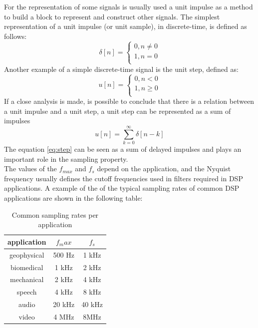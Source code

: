 For the representation of some signals is usually used a unit impulse as a method to build a block to represent and construct other signals. The simplest representation of a unit impulse (or unit sample), in discrete-time, is defined as follows:
\begin{equation}
    \delta[n] = \left\{ \begin{matrix} 
    0, n \ne 0\\
    1, n = 0\\
    \end{matrix}\right.
\end{equation}
Another example of a simple discrete-time signal is the unit step, defined as:
\begin{equation}
    u[n] = \left\{ \begin{matrix} 
    0, n < 0\\
    1, n \geq 0\\
    \end{matrix}\right.
\end{equation}
If a close analysis is made, is possible to conclude that there is a relation between a unit impulse and a unit step, a unit step can be represented as a sum of impulses
\begin{equation}\label{eq:step}
    u[n] = \sum_{k=0}^{\infty}\delta[n-k]
\end{equation}
The equation \ref{eq:step} can be seen as a sum of delayed impulses and plays an important role in the sampling property.\\
The values of the $f_{max}$ and $f_s$ depend on the application, and the Nyquist frequency usually defines the cutoff frequencies used in filters required in DSP applications. A example of the of the typical sampling rates of common DSP applications are shown in the following table:   
\begin{table}[!htpb]
   \centering
   \begin{tabular}{|c|c|c|} \toprule
       {application}&{$f_max$}&{$f_s$}\\
       \toprule
       {geophysical}&{500 Hz}&{1 kHz}\\
       {biomedical}&{1 kHz}&{2 kHz}\\
       {mechanical}&{2 kHz}&{4 kHz}\\
       {speech}&{4 kHz}&{8 kHz}\\
       {audio}&{20 kHz}&{40 kHz}\\
       {video}&{4 MHz}&{8MHz}\\
       \bottomrule
   \end{tabular} 
   \caption{Common sampling rates per application\cite{orfanidisIntroductionSignalProcessing1996}}  
    \label{tab:sampRat}     
\end{table} 

